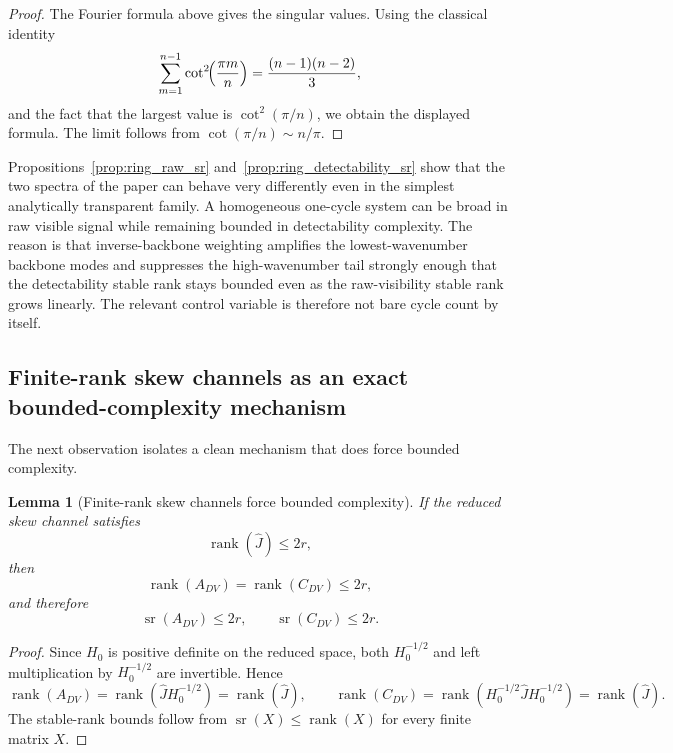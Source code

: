 \documentclass[11pt,a4paper]{article}
\numberwithin{equation}{section}
\DeclareMathOperator{\rank}{rank}
\theoremstyle{thmcompact}
\newtheorem{lemma}[theorem]{Lemma}
\theoremstyle{remark}
\begin{document}
\begin{proof}
The Fourier formula above gives the singular values. Using the classical identity
\begin{equation}
\sum_{m=1}^{n-1}\cot^2\!\Bigl(\frac{\pi m}{n}\Bigr)=\frac{(n-1)(n-2)}{3},
\end{equation}
and the fact that the largest value is \(\cot^2(\pi/n)\), we obtain the displayed formula. The limit follows from \(\cot(\pi/n)\sim n/\pi\).
\end{proof}

Propositions~\ref{prop:ring_raw_sr} and~\ref{prop:ring_detectability_sr} show that the two spectra of the paper can behave very differently even in the simplest analytically transparent family. A homogeneous one-cycle system can be broad in raw visible signal while remaining bounded in detectability complexity. The reason is that inverse-backbone weighting amplifies the lowest-wavenumber backbone modes and suppresses the high-wavenumber tail strongly enough that the detectability stable rank stays bounded even as the raw-visibility stable rank grows linearly. The relevant control variable is therefore not bare cycle count by itself.

\subsection{Finite-rank skew channels as an exact bounded-complexity mechanism}

The next observation isolates a clean mechanism that does force bounded complexity.

\begin{lemma}[Finite-rank skew channels force bounded complexity]
\label{lem:finite_rank_skew_bounded_complexity}
If the reduced skew channel satisfies
\begin{equation}
\rank(\widehat J)\le 2r,
\end{equation}
then
\begin{equation}
\rank(A_{DV})=\rank(C_{DV})\le 2r,
\end{equation}
and therefore
\begin{equation}
\operatorname{sr}(A_{DV})\le 2r,
\qquad
\operatorname{sr}(C_{DV})\le 2r.
\end{equation}
\end{lemma}

\begin{proof}
Since \(H_0\) is positive definite on the reduced space, both \(H_0^{-1/2}\) and left multiplication by \(H_0^{-1/2}\) are invertible. Hence
\begin{equation}
\rank(A_{DV})=\rank(\widehat J H_0^{-1/2})=\rank(\widehat J),
\qquad
\rank(C_{DV})=\rank(H_0^{-1/2}\widehat J H_0^{-1/2})=\rank(\widehat J).
\end{equation}
The stable-rank bounds follow from \(\operatorname{sr}(X)\le \rank(X)\) for every finite matrix \(X\).
\end{proof}
\end{document}
